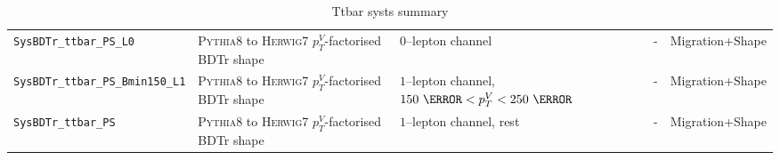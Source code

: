\begin{table}
{\begin{tabular}{lllll}
      \texttt{SysBDTr\_ttbar\_PS\_L0} & \textsc{Pythia8} to \textsc{Herwig7} $p_T^V$-factorised BDTr shape  & $0$--lepton channel & - & Migration+Shape \\
      \texttt{SysBDTr\_ttbar\_PS\_Bmin150\_L1} & \textsc{Pythia8} to \textsc{Herwig7} $p_T^V$-factorised BDTr shape  & $1$--lepton channel, $150~\GeV< p_T^V <250~\GeV$ & - & Migration+Shape \\
      \texttt{SysBDTr\_ttbar\_PS} & \textsc{Pythia8} to \textsc{Herwig7} $p_T^V$-factorised BDTr shape  & $1$--lepton channel, rest & - & Migration+Shape \\
\bottomrule
\end{tabular}
}
\caption[A summary of systematic uncertainties on the $t\bar{t}$ process.]{Ttbar
  systs summary}
\label{tab:ttbar-systs}
\end{table}